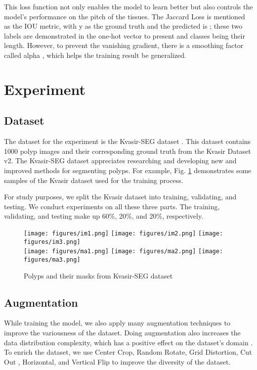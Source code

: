 \documentclass[conference]{IEEEtran}
\begin{document}
This loss function not only enables the model to learn better but also controls the model's performance on the pitch of the tissues. The Jaccard Loss \cite{jaacaard} is mentioned as the IOU metric, with y as the ground truth and the predicted is ; these two labels are demonstrated in the one-hot vector to present and classes  being their length. However, to prevent the vanishing gradient, there is a smoothing factor called alpha , which helps the training result be generalized.


\vspace{3mm}

\section{Experiment}
\label{sec:Experiment}

\subsection{Dataset}
The dataset for the experiment is the Kvasir-SEG dataset \cite{kvasir-seg}. This dataset contains 1000 polyp images and their corresponding ground truth from the Kvasir Dataset v2. The Kvasir-SEG dataset appreciates researching and developing new and improved methods for segmenting polyps. For example, Fig. \ref{fig:images} demonstrates some samples of the Kvasir dataset used for the training process.

\vspace{1mm}

For study purposes, we split the Kvasir dataset into training, validating, and testing. We conduct experiments on all these three parts. The training, validating, and testing make up 60\%, 20\%, and 20\%, respectively.



\begin{figure} [H]
    \centering
    \texttt{[image: figures/im1.png]}
    \texttt{[image: figures/im2.png]}
    \texttt{[image: figures/im3.png]}\\
    \texttt{[image: figures/ma1.png]}
    \texttt{[image: figures/ma2.png]}
    \texttt{[image: figures/ma3.png]}
    \caption{Polyps and their masks from Kvasir-SEG dataset}  
    \label{fig:images}
\end{figure}

\subsection{Augmentation}
While training the model, we also apply many augmentation techniques to improve the variousness of the dataset. Doing augmentation also increases the data distribution complexity, which has a positive effect on the dataset's domain \cite{augmentation}. To enrich the dataset, we use Center Crop, Random Rotate, Grid Distortion, Cut Out \cite{devries2017improved}, Horizontal, and Vertical Flip to improve the diversity of the dataset.
\end{document}
